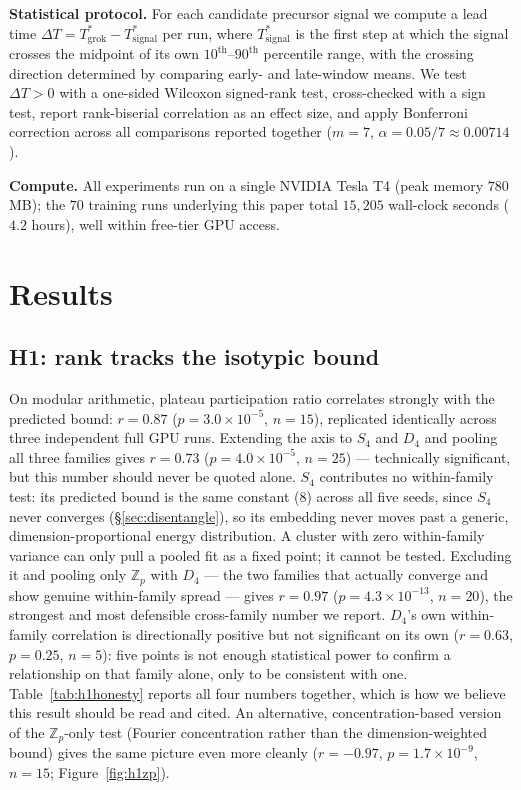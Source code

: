 \documentclass{article}
\begin{document}
\textbf{Statistical protocol.} For each candidate precursor signal we
compute a lead time $\Delta T = T^*_{\mathrm{grok}} - T^*_{\mathrm{signal}}$
per run, where $T^*_{\mathrm{signal}}$ is the first step at which the signal
crosses the midpoint of its own $10^{\mathrm{th}}$--$90^{\mathrm{th}}$
percentile range, with the crossing direction determined by comparing
early- and late-window means. We test $\Delta T > 0$ with a one-sided
Wilcoxon signed-rank test, cross-checked with a sign test, report
rank-biserial correlation as an effect size, and apply Bonferroni
correction across all comparisons reported together ($m=7$, $\alpha =
0.05/7 \approx 0.00714$).

\textbf{Compute.} All experiments run on a single NVIDIA Tesla T4 (peak
memory $780$\,MB); the $70$ training runs underlying this paper total
$15{,}205$ wall-clock seconds ($4.2$ hours), well within free-tier GPU
access.


\section{Results}
\label{sec:results}


\subsection{H1: rank tracks the isotypic bound}
\label{sec:h1_results}

On modular arithmetic, plateau participation ratio correlates strongly with
the predicted bound: $r=0.87$ ($p=3.0\times10^{-5}$, $n=15$), replicated
identically across three independent full GPU runs. Extending the axis to
$S_4$ and $D_4$ and pooling all three families gives $r=0.73$
($p=4.0\times10^{-5}$, $n=25$) --- technically significant, but this number
should never be quoted alone. $S_4$ contributes no within-family test:
its predicted bound is the same constant ($8$) across all five seeds,
since $S_4$ never converges (\S\ref{sec:disentangle}), so its embedding
never moves past a generic, dimension-proportional energy distribution.
A cluster with zero within-family variance can only pull a
pooled fit as a fixed point; it cannot be tested. Excluding it and pooling
only $\mathbb{Z}_p$ with $D_4$ --- the two families that actually converge
and show genuine within-family spread --- gives $r=0.97$
($p=4.3\times10^{-13}$, $n=20$), the strongest and most defensible
cross-family number we report. $D_4$'s own within-family correlation is
directionally positive but not significant on its own ($r=0.63$, $p=0.25$,
$n=5$): five points is not enough statistical power to confirm a
relationship on that family alone, only to be consistent with one.
Table~\ref{tab:h1honesty} reports all four numbers together, which is how
we believe this result should be read and cited. An alternative,
concentration-based version of the $\mathbb{Z}_p$-only test (Fourier
concentration rather than the dimension-weighted bound) gives the same
picture even more cleanly ($r=-0.97$, $p=1.7\times10^{-9}$, $n=15$;
Figure~\ref{fig:h1zp}).
\end{document}
